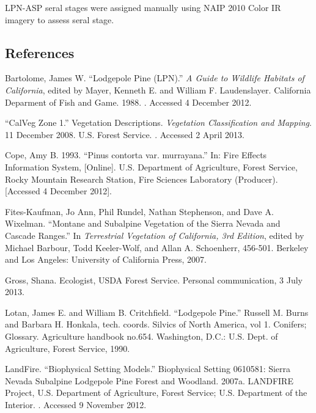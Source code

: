 LPN-ASP seral stages were assigned manually using NAIP 2010 Color IR imagery to assess seral stage.



\clearpage
\subsection*{References}

\begin{hangparas}{.25in}{1} 
Bartolome, James W. ``Lodgepole Pine (LPN).'' \emph{A Guide to Wildlife Habitats of California}, edited by Mayer, Kenneth E. and William F. Laudenslayer. California Deparment of Fish and Game. 1988. . Accessed 4 December 2012.

``CalVeg Zone 1.'' Vegetation Descriptions. \emph{Vegetation Classification and Mapping}.  11 December 2008. U.S. Forest Service. . Accessed 2 April 2013.

Cope, Amy B. 1993. ``Pinus contorta var. murrayana.'' In: Fire Effects Information System, [Online].  U.S. Department of Agriculture, Forest Service,  Rocky Mountain Research Station, Fire Sciences Laboratory (Producer).   [Accessed 4 December 2012].

Fites-Kaufman, Jo Ann, Phil Rundel, Nathan Stephenson, and Dave A. Wixelman. ``Montane and Subalpine Vegetation of the Sierra Nevada and Cascade Ranges.'' In \emph{Terrestrial Vegetation of California, 3rd Edition}, edited by Michael Barbour, Todd Keeler-Wolf, and Allan A. Schoenherr, 456-501. Berkeley and Los Angeles: University of California Press, 2007. 

Gross, Shana. Ecologist, USDA Forest Service. Personal communication, 3 July 2013.

Lotan, James E. and William B. Critchfield. ``Lodgepole Pine.'' Russell M. Burns and Barbara H. Honkala, tech. coords. Silvics of North America, vol 1. Conifers; Glossary. Agriculture handbook no.654. Washington, D.C.: U.S. Dept. of Agriculture, Forest Service, 1990. 

LandFire. ``Biophysical Setting Models.'' Biophysical Setting 0610581: Sierra Nevada Subalpine Lodgepole Pine Forest and Woodland. 2007a. LANDFIRE Project, U.S. Department of Agriculture, Forest Service; U.S. Department of the Interior. . Accessed 9 November 2012.


\end{hangparas}
